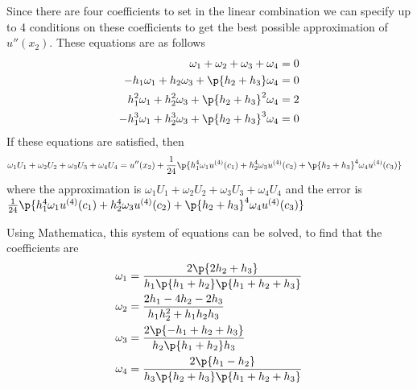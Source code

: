 \documentclass[11pt, oneside]{article}
\begin{document}
\begin{enumerate}
        Since there are four coefficients to set in the linear combination we can
        specify up to 4 conditions on these coefficients to get the best possible
        approximation of $u''(x_2)$.
        These equations are as follows
        \begin{align*}
            \omega_1 + \omega_2 + \omega_3 + \omega_4 &= 0 \\
            -h_1 \omega_1 + h_2 \omega_3 + \p{h_2 + h_3} \omega_4 &= 0 \\
            h_1^2 \omega_1 + h_2^2 \omega_3 + \p{h_2 + h_3}^2 \omega_4 &= 2 \\
            -h_1^3 \omega_1 + h_2^3 \omega_3 + \p{h_2 + h_3}^3 \omega_4 &= 0
        \end{align*}
        If these equations are satisfied, then
        \begin{align*}
            \omega_1 U_1 + \omega_2 U_2 + \omega_3 U_3 + \omega_4 U_4 &= u''(x_2) + \frac{1}{24}\p{h_1^4 \omega_1 u^{(4)}(c_1) + h_2^4 \omega_3 u^{(4)}(c_2)+ \p{h_2 + h_3}^4 \omega_4 u^{(4)}(c_3)}
        \end{align*}
        where the approximation is $\omega_1 U_1 + \omega_2 U_2 + \omega_3 U_3 + \omega_4 U_4$
        and the error is \\
        $\frac{1}{24}\p{h_1^4 \omega_1 u^{(4)}(c_1) + h_2^4 \omega_3 u^{(4)}(c_2)+ \p{h_2 + h_3}^4 \omega_4 u^{(4)}(c_3)}$

        Using Mathematica, this system of equations can be solved, to find that
        the coefficients are
        \begin{align*}
            \omega_1 &= \frac{2\p{2 h_2 + h_3}}{h_1 \p{h_1 + h_2}\p{h_1 + h_2 + h_3}} \\
            \omega_2 &= \frac{2h_1 - 4 h_2 - 2 h_3}{h_1 h_2^2 + h_1 h_2 h_3} \\
            \omega_3 &= \frac{2\p{-h_1 + h_2 + h_3}}{h_2\p{h_1 + h_2} h_3} \\
            \omega_4 &= \frac{2\p{h_1 - h_2}}{h_3\p{h_2 + h_3}\p{h_1 + h_2 + h_3}}
        \end{align*}


\end{enumerate}
\end{document}

